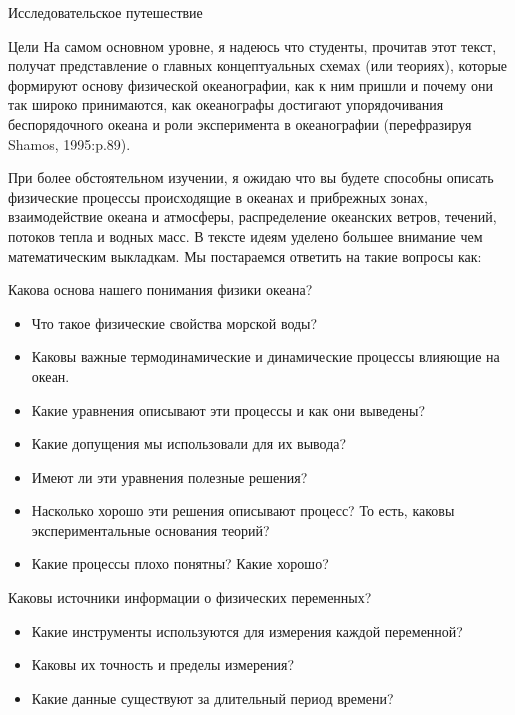 \begin{chapter}{Исследовательское путешествие}
\begin{section}{Цели}
На самом основном уровне, я надеюсь что студенты, прочитав этот текст, получат 
представление о главных концептуальных схемах (или теориях), которые формируют 
основу физической океанографии, как к ним пришли и почему они так широко 
принимаются, как океанографы достигают упорядочивания беспорядочного океана 
и роли эксперимента в океанографии (перефразируя Shamos, 1995:p.89).

При более обстоятельном изучении, я ожидаю что вы будете способны описать 
физические процессы происходящие в океанах и прибрежных зонах, взаимодействие 
океана и атмосферы, распределение океанских ветров, течений, потоков тепла 
и водных масс. В тексте идеям уделено большее внимание чем математическим 
выкладкам. Мы постараемся ответить на такие вопросы как:

Какова основа нашего понимания физики океана?

\begin{itemize}
\item
Что такое физические свойства морской воды? 

\item
Каковы важные термодинамические и динамические процессы влияющие на океан. 

\item
Какие уравнения описывают эти процессы и как они выведены? 

\item
Какие допущения мы использовали для их вывода? 

\item
Имеют ли эти уравнения полезные решения? 

\item
Насколько хорошо эти решения описывают процесс? То есть, каковы 
экспериментальные основания теорий? 

\item
Какие процессы плохо понятны? Какие хорошо?
\end{itemize}

Каковы источники информации о физических переменных?
\begin{itemize}
\item
Какие инструменты используются для измерения каждой переменной? 

\item
Каковы их точность и пределы измерения? 

\item
Какие данные существуют за длительный период времени? 


\end{itemize}
\end{section}
\end{chapter}
